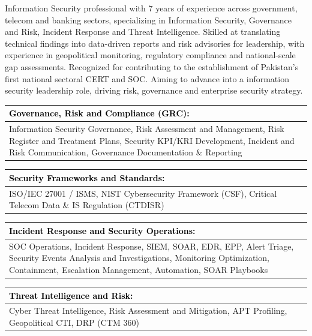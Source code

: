 \documentclass{resume}
\begin{document}
\makeheader
\vspace{0.05cm}
Information Security professional with 7 years of experience across government, telecom and banking sectors, specializing in Information Security, Governance and Risk, Incident Response and Threat Intelligence. Skilled at translating technical findings into data-driven reports and risk advisories for leadership, with experience in geopolitical monitoring, regulatory compliance and national-scale gap assessments. Recognized for contributing to the establishment of Pakistan's first national sectoral CERT and SOC. Aiming to advance into a information security leadership role, driving risk, governance and enterprise security strategy.

\begin{tabularx}{\linewidth}{|X|}
    \hline
    \cellcolor{lightblue}\textcolor{black}{Governance, Risk and Compliance (GRC):} \\
    \hline
    Information Security Governance, Risk Assessment and Management, Risk Register and Treatment Plans, Security KPI/KRI Development, Incident and Risk Communication, Governance Documentation \& Reporting\\
    \hline
\end{tabularx}

\begin{tabularx}{\linewidth}{|X|}
    \hline
    \cellcolor{lightblue}\textcolor{black}{Security Frameworks and Standards:} \\
    \hline
    ISO/IEC 27001 / ISMS, NIST Cybersecurity Framework (CSF), Critical Telecom Data \& IS Regulation (CTDISR) \\ 
    \hline
\end{tabularx}

\begin{tabularx}{\linewidth}{|X|}
    \hline
    \cellcolor{lightblue}\textcolor{black}{Incident Response and Security Operations:} \\
    \hline
    SOC Operations, Incident Response, SIEM, SOAR, EDR, EPP, Alert Triage, Security Events Analysis and Investigations, Monitoring Optimization, Containment, Escalation Management, Automation, SOAR Playbooks \\

    \hline
\end{tabularx}

\begin{tabularx}{\linewidth}{|X|}
    \hline
    \cellcolor{lightblue}\textcolor{black}{Threat Intelligence and Risk:} \\
    \hline
    Cyber Threat Intelligence, Risk Assessment and Mitigation, APT Profiling, Geopolitical CTI, DRP (CTM 360) \\
    \hline
\end{tabularx}
\end{document}

